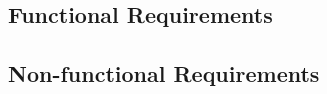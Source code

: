 \documentclass{article}
\begin{document}
\subsection{Functional Requirements}



\subsection{Non-functional Requirements}



\section{}

\newpage

\nocite{*}
\printbibliography[title={Citations}]
\end{document}
